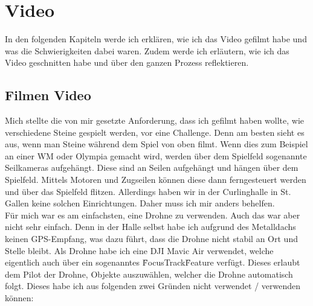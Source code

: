 \documentclass[11pt]{article}
\begin{document}
    \section{Video}
    In den folgenden Kapiteln werde ich erklären, wie ich das Video gefilmt habe und was die Schwierigkeiten dabei waren. Zudem werde ich
    erläutern, wie ich das Video geschnitten habe und über den ganzen Prozess reflektieren.

    \subsection{Filmen Video}
    Mich stellte die von mir gesetzte Anforderung, dass ich gefilmt haben wollte, wie verschiedene Steine gespielt werden, vor eine Challenge.
    Denn am besten sieht es aus, wenn man Steine während dem Spiel von oben filmt. Wenn dies zum Beispiel an einer WM oder Olympia gemacht wird,
    werden über dem Spielfeld sogenannte Seilkameras aufgehängt. Diese sind an Seilen aufgehängt und hängen über dem Spielfeld. Mittels Motoren
    und Zugseilen können diese dann ferngesteuert werden und über das Spielfeld flitzen. Allerdings haben wir in der Curlinghalle in St. Gallen
    keine solchen Einrichtungen. Daher muss ich mir anders behelfen.\\
    Für mich war es am einfachsten, eine Drohne zu verwenden. Auch das war aber nicht sehr einfach. Denn in der Halle selbst habe ich aufgrund
    des Metalldachs keinen GPS-Empfang, was dazu führt, dass die Drohne nicht stabil an Ort und Stelle bleibt.
    Als Drohne habe ich eine DJI Mavic Air verwendet, welche eigentlich auch über ein sogenanntes \"FocusTrack\" Feature verfügt. Dieses erlaubt dem
    Pilot der Drohne, Objekte auszuwählen, welcher die Drohne automatisch folgt. Dieses habe ich aus folgenden zwei Gründen nicht verwendet
    / verwenden können:
\end{document}
